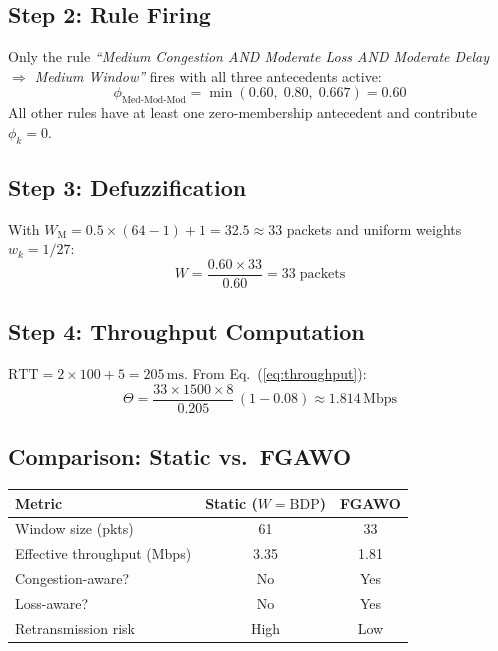 \documentclass[10pt, twocolumn]{IEEEtran}
\theoremstyle{definition}
\begin{document}
\subsection{Step 2: Rule Firing}

Only the rule \emph{``Medium Congestion AND Moderate Loss AND Moderate Delay $\Rightarrow$ Medium Window''} fires with all three antecedents active:
\begin{equation*}
  \phi_{\text{Med-Mod-Mod}} = \min(0.60,\; 0.80,\; 0.667) = 0.60
\end{equation*}
All other rules have at least one zero-membership antecedent and contribute $\phi_k = 0$.

\subsection{Step 3: Defuzzification}

With $W_{\text{M}} = 0.5 \times (64-1) + 1 = 32.5 \approx 33$ packets and uniform weights $w_k = 1/27$:
\begin{equation*}
  W = \frac{0.60 \times 33}{0.60} = 33\;\text{packets}
\end{equation*}

\subsection{Step 4: Throughput Computation}

$\text{RTT} = 2 \times 100 + 5 = 205\,\text{ms}$. From Eq.~(\ref{eq:throughput}):
\begin{equation*}
  \Theta = \frac{33 \times 1500 \times 8}{0.205}\,(1-0.08) \approx 1.814\,\text{Mbps}
\end{equation*}

\subsection{Comparison: Static vs.\ FGAWO}

\begin{center}
\small
\begin{tabular}{lcc}
\toprule
Metric & Static ($W = \text{BDP}$) & FGAWO \\
\midrule
Window size (pkts)          & 61   & 33   \\
Effective throughput (Mbps) & 3.35 & 1.81 \\
Congestion-aware?           & No   & Yes  \\
Loss-aware?                 & No   & Yes  \\
Retransmission risk         & High & Low  \\
\bottomrule
\end{tabular}
\end{center}
\end{document}
